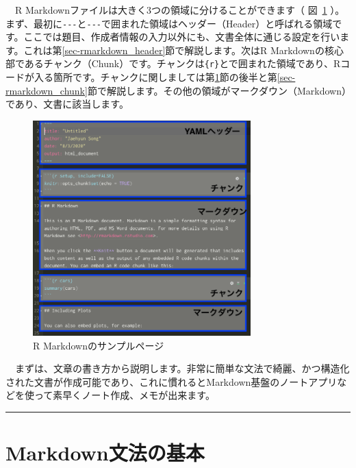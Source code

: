 \documentclass[
  a4paper,
  pandoc,
  ja=standard,
  jafont=haranoaji]{bxjsbook}
\begin{document}
　R Markdownファイルは大きく3つの領域に分けることができます（
図~\ref{fig-rmarkdown_sample}
）。まず、最初に\texttt{-\/-\/-}と\texttt{-\/-\/-}で囲まれた領域はヘッダー（Header）と呼ばれる領域です。ここでは題目、作成者情報の入力以外にも、文書全体に通じる設定を行います。これは第\ref{sec-rmarkdown_header}節で解説します。次はR
Markdownの核心部であるチャンク（Chunk）です。チャンクは\texttt{\textasciigrave{}\textasciigrave{}\textasciigrave{}\{r\}}と\texttt{\textasciigrave{}\textasciigrave{}\textasciigrave{}}で囲まれた領域であり、Rコードが入る箇所です。チャンクに関しましては第\ref{sec-rmarkdown_grammar}節の後半と第\ref{sec-rmarkdown_chunk}節で解説します。その他の領域がマークダウン（Markdown）であり、文書に該当します。

\begin{figure}

{\centering \includegraphics[width=0.75\textwidth,height=\textheight]{./Figs/Markdown/SamplePage.png}

}

\caption{\label{fig-rmarkdown_sample}R Markdownのサンプルページ}

\end{figure}

　まずは、文章の書き方から説明します。非常に簡単な文法で綺麗、かつ構造化された文書が作成可能であり、これに慣れるとMarkdown基盤のノートアプリなどを使って素早くノート作成、メモが出来ます。

\begin{center}\rule{0.5\linewidth}{0.5pt}\end{center}

\hypertarget{sec-rmarkdown_grammar}{%
\section{Markdown文法の基本}\label{sec-rmarkdown_grammar}}
\end{document}
